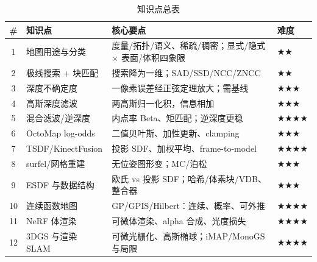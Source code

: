 \begin{table}[H]\centering\small
\caption{知识点总表}
\begin{tabular}{clll}
\toprule
\# & 知识点 & 核心要点 & 难度 \\
\midrule
1 & 地图用途与分类 & 度量/拓扑/语义、稀疏/稠密；显式/隐式 $\times$ 表面/体积四象限 & $\bigstar\bigstar$ \\
2 & 极线搜索 + 块匹配 & 搜索降为一维；SAD/SSD/NCC/ZNCC & $\bigstar\bigstar$ \\
3 & 深度不确定度 & 一像素误差经正弦定理放大；需基线 & $\bigstar\bigstar\bigstar$ \\
4 & 高斯深度滤波 & 两高斯归一化积，信息相加 & $\bigstar\bigstar\bigstar$ \\
5 & 混合滤波/逆深度 & 内点率 Beta、矩匹配；逆深度更稳 & $\bigstar\bigstar\bigstar\bigstar$ \\
6 & OctoMap log-odds & 二值贝叶斯、加性更新、clamping & $\bigstar\bigstar\bigstar$ \\
7 & TSDF/KinectFusion & 投影 SDF、加权平均、frame-to-model & $\bigstar\bigstar\bigstar\bigstar$ \\
8 & surfel/网格重建 & 无位姿图形变；MC/泊松 & $\bigstar\bigstar\bigstar$ \\
9 & ESDF 与数据结构 & 欧氏 vs 投影 SDF；哈希/体素块/VDB、整合器 & $\bigstar\bigstar\bigstar$ \\
10 & 连续函数地图 & GP/GPIS/Hilbert：连续、概率、可外推 & $\bigstar\bigstar\bigstar\bigstar$ \\
11 & NeRF 体渲染 & 可微体渲染、alpha 合成、光度损失 & $\bigstar\bigstar\bigstar\bigstar$ \\
12 & 3DGS 与渲染 SLAM & 可微光栅化、高斯椭球；iMAP/MonoGS 与局限 & $\bigstar\bigstar\bigstar\bigstar$ \\
\bottomrule
\end{tabular}
\end{table}

